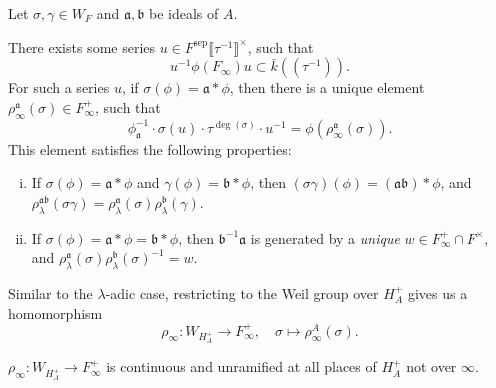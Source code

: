 \documentclass{article}
\newcommand{\perf}{\mathrm{perf}}
\newcommand{\sep}{\mathrm{sep}}
\newcommand{\llpar}{(\!(}
\newcommand{\rrpar}{)\!)}
\begin{document}
\begin{lemma}\label{lem: to define infty-adic representation}
    Let $\sigma, \gamma\in W_F$ and $\mathfrak{a}, \mathfrak{b}$ be ideals of $A$.

    There exists some series $u\in F^\sep\llbracket\tau^{-1}\rrbracket^\times$, such that \[u^{-1}\phi(F_\infty)u\subset \bar{k}\llpar\tau^{-1}\rrpar.\]
    For such a series $u$, if $\sigma(\phi) = \mathfrak{a} * \phi$,
    then there is a unique element $\rho_\infty^\mathfrak{a}(\sigma)\in F_\infty^+$,
    such that \[\phi_\mathfrak{a}^{-1}\cdot\sigma(u)\cdot\tau^{\deg(\sigma)}\cdot u^{-1} = \phi(\rho_\infty^\mathfrak{a}(\sigma)).\]
    This element satisfies the following properties:
    \begin{enumerate}[(i)]
    \item If $\sigma(\phi) = \mathfrak{a}*\phi$ and $\gamma(\phi) = \mathfrak{b}*\phi$,
    then $(\sigma\gamma)(\phi) = (\mathfrak{a}\mathfrak{b}) * \phi$, and $\rho_{\lambda}^{\mathfrak{ab}}(\sigma\gamma) = \rho_\lambda^\mathfrak{a}(\sigma)\rho_\lambda^\mathfrak{b}(\gamma)$.
    \item If $\sigma(\phi) = \mathfrak{a}*\phi = \mathfrak{b}*\phi$, then $\mathfrak{b}^{-1}\mathfrak{a}$ is generated by a \textit{unique} $w\in F_\infty^+\cap F^\times$, and $\rho_\lambda^\mathfrak{a}(\sigma)\rho_\lambda^\mathfrak{b}(\sigma)^{-1} = w$.
    \end{enumerate}
\end{lemma}

Similar to the $\lambda$-adic case, restricting to the Weil group over $H_A^+$ gives us a homomorphism
\[\rho_\infty : W_{H_A^+}\to F_\infty^+,\quad \sigma\mapsto \rho_\infty^A(\sigma).\]


\begin{lemma}\label{lem: infty-adic representation at Weil group of narrow Hilbert class field is almost unramified}
    $\rho_\infty : W_{H_A^+}\to F_\infty^+$ is continuous and unramified at all places of $H_A^+$ not over $\infty$.
\end{lemma}
\end{document}
